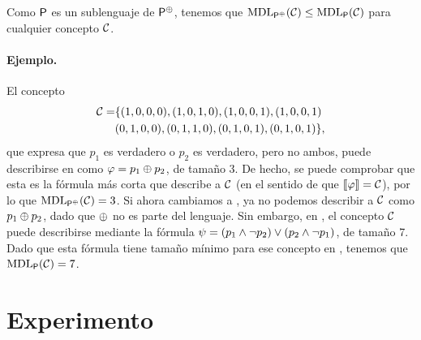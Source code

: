 Como ${\sf P}$ es un sublenguaje de ${\sf P}^\oplus$, tenemos que ${\rm MDL}_{{\sf P}^\oplus}(\mathcal{C})\leq{\rm MDL}_{{\sf P}}(\mathcal{C})$ para cualquier concepto $\mathcal{C}$.

\paragraph*{Ejemplo.}El concepto 
\begin{align*}
\mathcal{C}=&\{(1,0,0,0),(1,0,1,0),(1,0,0,1),(1,0,0,1)\\
&(0,1,0,0),(0,1,1,0),(0,1,0,1),(0,1,0,1)\},
\end{align*}
que expresa que $p_1$ es verdadero o $p_2$ es verdadero, pero no ambos, puede describirse en \gramboolxor como $\varphi=p_{1} \oplus p_{2}$, de tamaño 3. De hecho, se puede comprobar que esta es la fórmula más corta que describe a $\mathcal{C}$ (en el sentido de que $\llbracket \varphi\rrbracket=\mathcal{C}$), por lo que ${\rm MDL}_{{\sf P}^\oplus}(\mathcal{C})=3$. Si ahora cambiamos a \grambool, ya no podemos describir a $\mathcal{C}$ como $p_{1} \oplus p_{2}$, dado que $\oplus$ no es parte del lenguaje. Sin embargo, en \grambool, el concepto $\mathcal{C}$ puede describirse mediante la fórmula $\psi=(p_{1} \wedge \neg p_{2}) \vee (p_{2} \wedge \neg p_{1})$, de tamaño 7. Dado que esta fórmula tiene tamaño mínimo para ese concepto en \grambool, tenemos que ${\rm MDL}_{{\sf P}}(\mathcal{C})=7$.


\section{Experimento}


